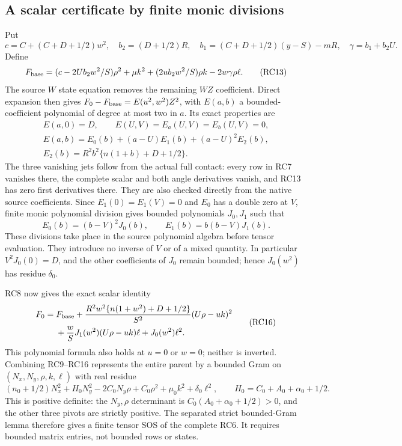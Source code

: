 \subsection{A scalar certificate by finite monic divisions}

Put
\[
 c=C+(C+D+1/2)w^2,\quad b_2=(D+1/2)R,
 \quad b_1=(C+D+1/2)(y-S)-mR,\quad \gamma=b_1+b_2U.
\]
Define
\[
 F_{\rm base}=(c-2Ub_2w^2/S)\rho^2+\mu k^2
       +(2ub_2w^2/S)\rho k-2w\gamma\rho\ell.
 \tag{RC13}
\]
The source $W$ state equation removes the remaining $WZ$
coefficient. Direct expansion then gives
$F_0-F_{\rm base}=E(u^2,w^2)Z^2$, with $E(a,b)$ a
bounded-coefficient polynomial of degree at most two in $a$.
Its exact properties are
\[
\begin{gathered}
 E(a,0)=D,\qquad E(U,V)=E_a(U,V)=E_b(U,V)=0,\\
 E(a,b)=E_0(b)+(a-U)E_1(b)+(a-U)^2E_2(b),\\
 E_2(b)=R^2b^2\{n(1+b)+D+1/2\}.
\end{gathered}\tag{RC14}
\]
The three vanishing jets follow from the actual full contact:
every row in RC7 vanishes there, the complete scalar and both
angle derivatives vanish, and RC13 has zero first derivatives
there. They are also checked directly from the native source
coefficients. Since $E_1(0)=E_1(V)=0$ and $E_0$ has a double
zero at $V$, finite monic polynomial division gives bounded
polynomials $J_0,J_1$ such that
\[
 E_0(b)=(b-V)^2J_0(b),\qquad
 E_1(b)=b(b-V)J_1(b).
 \tag{RC15}
\]
These divisions take place in the source polynomial algebra before
tensor evaluation. They introduce no inverse of $V$ or of a mixed
quantity. In particular $V^2J_0(0)=D$, and the other coefficients
of $J_0$ remain bounded; hence $J_0(w^2)$ has residue $\delta_0$.

RC8 now gives the exact scalar identity
\[
\begin{split}
 F_0={}&F_{\rm base}
 +\frac{R^2w^2\{n(1+w^2)+D+1/2\}}{S^2}(U\rho-uk)^2\\
 &+\frac wS J_1(w^2)(U\rho-uk)\ell+J_0(w^2)\ell^2.
\end{split}\tag{RC16}
\]
This polynomial formula also holds at $u=0$ or $w=0$; neither
is inverted. Combining RC9--RC16 represents the entire parent
by a bounded Gram on $(N_x,N_y,\rho,k,\ell)$ with real residue
\[
 (n_0+1/2)N_x^2+H_0N_y^2-2C_0N_y\rho+C_0\rho^2
                              +\mu_0k^2+\delta_0\ell^2,
 \qquad H_0=C_0+A_0+\alpha_0+1/2.
 \tag{RC17}
\]
This is positive definite: the $N_y,\rho$ determinant is
$C_0(A_0+\alpha_0+1/2)>0$, and the other three pivots are
strictly positive. The separated strict bounded-Gram lemma
therefore gives a finite tensor SOS of the complete RC6. It
requires bounded matrix entries, not bounded rows or states.

